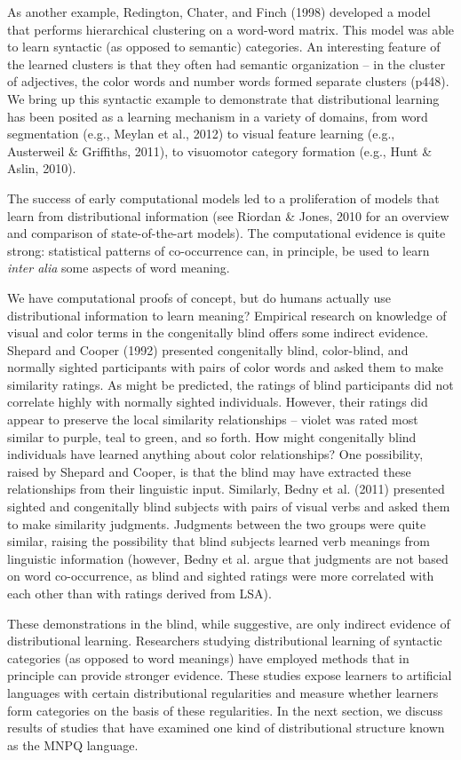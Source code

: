\documentclass[man,floatsintext]{apa6}
\begin{document}
As another example, Redington, Chater, and Finch (1998) developed a
model that performs hierarchical clustering on a word-word
matrix. This model was able to learn syntactic (as opposed to
semantic) categories. An interesting feature of the learned clusters
is that they often had semantic organization -- in the cluster of
adjectives, the color words and number words formed separate clusters
(p448). We bring up this syntactic example to demonstrate that
distributional learning has been posited as a learning mechanism in a
variety of domains, from word segmentation (e.g., Meylan et al., 2012)
to visual feature learning (e.g., Austerweil \& Griffiths, 2011), to
visuomotor category formation (e.g., Hunt \& Aslin, 2010).

The success of early computational models led to a proliferation of
models that learn from distributional information (see Riordan \&
Jones, 2010 for an overview and comparison of state-of-the-art
models). The computational evidence is quite strong: statistical
patterns of co-occurrence can, in principle, be used to learn
\emph{inter alia} some aspects of word meaning.

We have computational proofs of concept, but do humans actually use
distributional information to learn meaning? Empirical research on
knowledge of visual and color terms in the congenitally blind offers
some indirect evidence. Shepard and Cooper (1992) presented
congenitally blind, color-blind, and normally sighted participants
with pairs of color words and asked them to make similarity
ratings. As might be predicted, the ratings of blind participants did
not correlate highly with normally sighted individuals. However, their
ratings did appear to preserve the local similarity relationships --
violet was rated most similar to purple, teal to green, and so
forth. How might congenitally blind individuals have learned anything
about color relationships? One possibility, raised by Shepard and
Cooper, is that the blind may have extracted these relationships from
their linguistic input. Similarly, Bedny et al. (2011) presented
sighted and congenitally blind subjects with pairs of visual verbs and
asked them to make similarity judgments. Judgments between the two
groups were quite similar, raising the possibility that blind subjects
learned verb meanings from linguistic information (however, Bedny et
al. argue that judgments are not based on word co-occurrence, as blind
and sighted ratings were more correlated with each other than with
ratings derived from LSA).

These demonstrations in the blind, while suggestive, are only indirect
evidence of distributional learning. Researchers studying
distributional learning of syntactic categories (as opposed to word
meanings) have employed methods that in principle can provide stronger
evidence. These studies expose learners to artificial languages with
certain distributional regularities and measure whether learners form
categories on the basis of these regularities. In the next section, we
discuss results of studies that have examined one kind of
distributional structure known as the MNPQ language.
\end{document}
